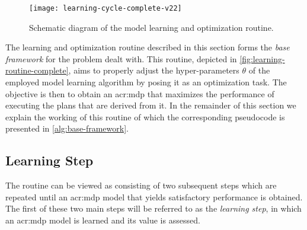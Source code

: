 \begin{figure}[t]
	\centering
	\texttt{[image: learning-cycle-complete-v22]}
	\caption{Schematic diagram of the model learning and optimization routine.}
	\label{fig:learning-routine-complete}
\end{figure}

The learning and optimization routine described in this section forms the \textit{base framework} for the problem dealt with.
This routine, depicted in \autoref{fig:learning-routine-complete}, aims to properly adjust the hyper-parameters $\theta$ of the employed model learning algorithm by posing it as an optimization task.
The objective is then to obtain an \acrshort{acr:mdp} that maximizes the performance of executing the plans that are derived from it.
In the remainder of this section we explain the working of this routine of which the corresponding pseudocode is presented in \autoref{alg:base-framework}.


\subsection{Learning Step}
\label{sec:learning-step}

The routine can be viewed as consisting of two subsequent steps which are repeated until an \acrshort{acr:mdp} model that yields satisfactory performance is obtained.
The first of these two main steps will be referred to as the \textit{learning step}, in which an \acrshort{acr:mdp} model is learned and its value is assessed.

